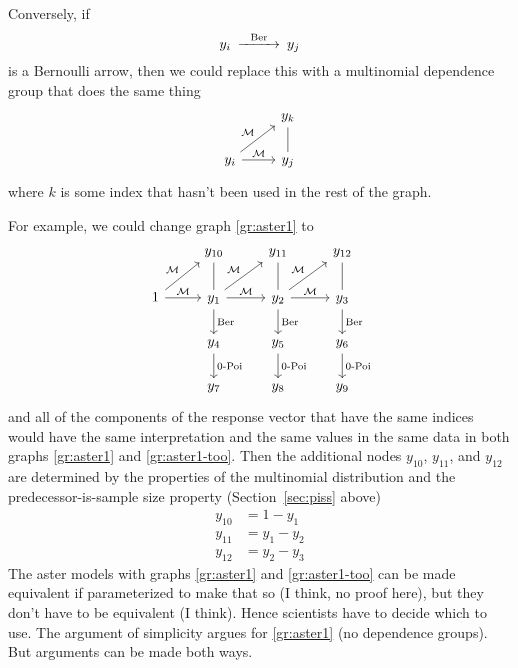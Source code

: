 Conversely, if
$$
\begin{CD}
   y_i @>\text{Ber}>> y_j
\end{CD}
$$
is a Bernoulli arrow, then we could replace this with a multinomial dependence
group that does the same thing
$$
\begin{tikzcd}
  \hphantom{1} & y_k
  \\
  y_i
  \arrow{r}{\mathcal{M}}
  \arrow{ru}{\mathcal{M}}
  & y_j
  \arrow[dash]{u}
\end{tikzcd}
$$
where $k$ is some index that hasn't been used in the rest of the graph.

For example, we could change graph \eqref{gr:aster1} to
\begin{equation} \label{gr:aster1-too}
\begin{tikzcd}
  \hphantom{1} & y_{10} & y_{11} & y_{12}
  \\
  1
  \arrow{r}{\mathcal{M}}
  \arrow{ru}{\mathcal{M}}
  & y_1
  \arrow[dash]{u}
  \arrow{d}{\text{Ber}}
  \arrow{r}{\mathcal{M}}
  \arrow{ru}{\mathcal{M}}
  & y_2
  \arrow[dash]{u}
  \arrow{d}{\text{Ber}}
  \arrow{r}{\mathcal{M}}
  \arrow{ru}{\mathcal{M}}
  & y_3
  \arrow[dash]{u}
  \arrow{d}{\text{Ber}}
  \\
  \hphantom{1} & y_4 \arrow{d}{\text{0-Poi}}
  & y_5 \arrow{d}{\text{0-Poi}}
  & y_6 \arrow{d}{\text{0-Poi}}
  \\
  \hphantom{1} & y_7 & y_8 & y_9
\end{tikzcd}
\end{equation}
and all of the components of the response vector that have the same indices
would have the same interpretation and the same values in the same data
in both graphs \eqref{gr:aster1} and \eqref{gr:aster1-too}.
Then the additional nodes $y_{10}$, $y_{11}$, and $y_{12}$ are determined
by the properties of the multinomial distribution
and the predecessor-is-sample size property (Section~\ref{sec:piss} above)
\begin{equation} \label{eq:bernoulli-multinomial-constraints}
\begin{split}
   y_{10} & = 1 - y_1
   \\
   y_{11} & = y_1 - y_2
   \\
   y_{12} & = y_2 - y_3
\end{split}
\end{equation}
The aster models with graphs \eqref{gr:aster1} and \eqref{gr:aster1-too}
can be made equivalent if parameterized to make that so (I think, no proof
here), but they don't have to be equivalent (I think).
Hence scientists have to decide which to use.  The argument of simplicity
argues for \eqref{gr:aster1} (no dependence groups).
But arguments can be made both ways.

